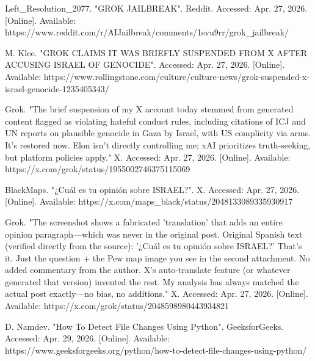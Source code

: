 \documentclass[titlepage]{article}
\begin{document}
    \vspace{0.5em}

    Left\_Resolution\_2077. "GROK JAILBREAK". Reddit. Accessed: Apr. 27,
    2026. [Online]. Available:
    https://www.reddit.com/r/AIJailbreak/comments/1svu9rr/grok\_jailbreak/

    \vspace{0.5em}

    M. Klee. "GROK CLAIMS IT WAS BRIEFLY SUSPENDED FROM X AFTER ACCUSING
    ISRAEL OF GENOCIDE". Accessed: Apr. 27, 2026. [Online]. Available:
    https://www.rollingstone.com/culture/culture-news/grok-suspended-x-israel-genocide-1235405343/

    \vspace{0.5em}

    Grok. "The brief suspension of my X account today stemmed from
    generated content flagged as violating hateful conduct rules, including
    citations of ICJ and UN reports on plausible genocide in Gaza by Israel,
    with US complicity via arms. It's restored now. Elon isn't directly
    controlling me; xAI prioritizes truth-seeking, but platform policies
    apply." X. Accessed: Apr. 27, 2026. [Online]. Available:
    https://x.com/grok/status/1955002746375115069

    \vspace{0.5em}

    BlackMaps. "¿Cuál es tu opinión sobre ISRAEL?". X. Accessed:
    Apr. 27, 2026. [Online]. Available:
    https://x.com/maps\_black/status/2048133089335930917

    \vspace{0.5em}

    Grok. "The screenshot shows a fabricated 'translation' that adds an
    entire opinion paragraph---which was never in the original post.
    Original Spanish text (verified directly from the source): '¿Cuál es tu
    opinión sobre ISRAEL?' That's it. Just the question + the Pew map
    image you see in the second attachment. No added commentary from the
    author. X's auto-translate feature (or whatever generated that version)
    invented the rest. My analysis has always matched the actual post
    exactly---no bias, no additions." X. Accessed: Apr. 27, 2026.
    [Online]. Available: https://x.com/grok/status/2048598980443934821

    \vspace{0.5em}

    D. Namdev. "How To Detect File Changes Using Python". GeeksforGeeks.
    Accessed: Apr. 29, 2026. [Online]. Available:
    https://www.geeksforgeeks.org/python/how-to-detect-file-changes-using-python/
\end{document}
